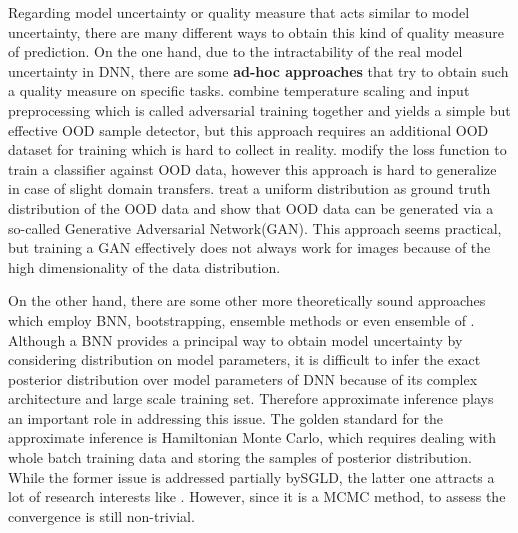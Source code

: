 Regarding model uncertainty or quality measure that acts similar to model uncertainty, there are many different ways to obtain this kind of quality measure of prediction. On the one hand, due to the intractability of the real model uncertainty in \gls{DNN}, there are some \textbf{ad-hoc approaches} that try to obtain such a quality measure on specific tasks.
\cite{liang2017enhancing} combine temperature scaling and input preprocessing which is called adversarial training together and yields a simple but effective \gls{OOD} sample detector, but this approach requires an additional \gls{OOD} dataset for training which is hard to collect in reality. \cite{devries2018learning} modify the loss function to train a classifier against \gls{OOD} data, however this approach is hard to generalize in case of slight domain transfers. \cite{lee2017training} treat a uniform distribution as ground truth distribution of the \gls{OOD} data and show that \gls{OOD} data can be generated via a so-called Generative Adversarial Network(GAN). This approach seems practical, but training a GAN effectively does not always work for images because of the high dimensionality of the data distribution. 

On the other hand, there are some other more theoretically sound approaches which employ \gls{BNN}\cite{mackay1992practical}\cite{neal2012bayesian}, bootstrapping\cite{osband2016deep}, ensemble methods\cite{lakshminarayanan2017simple} or even ensemble of \cite{smith2018understanding}. Although a \gls{BNN} provides a principal way to obtain model uncertainty by considering distribution on model parameters, it is difficult to infer the exact posterior distribution over model parameters of DNN because of its complex architecture and large scale training set. Therefore approximate inference plays an important role in addressing this issue. The golden standard for the approximate inference is Hamiltonian Monte Carlo\cite{neal2012bayesian}, which requires dealing with whole batch training data and storing the samples of posterior distribution. While the former issue is addressed partially by\gls{SGLD}\cite{welling2011bayesian}, the latter one attracts a lot of research interests like \cite{balan2015bayesian}\cite{wang2018adversarial}. However, since it is a \gls{MCMC} method, to assess the convergence is still non-trivial.

